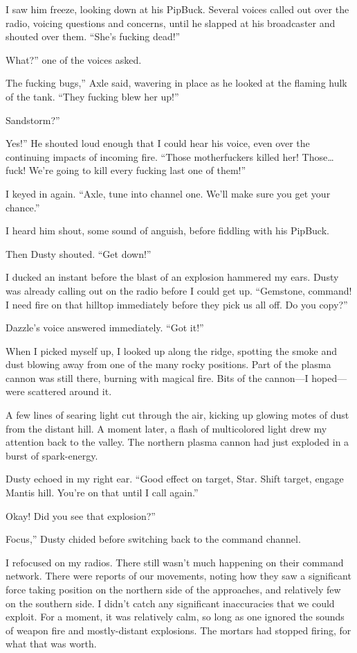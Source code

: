 I saw him freeze, looking down at his PipBuck. Several voices called out over the radio, voicing questions and concerns, until he slapped at his broadcaster and shouted over them. “She’s fucking dead!”

\leavevmode{}What?” one of the voices asked.

\leavevmode{}The fucking bugs,” Axle said, wavering in place as he looked at the flaming hulk of the tank. “They fucking blew her up!”

\leavevmode{}Sandstorm?”

\leavevmode{}Yes!” He shouted loud enough that I could hear his voice, even over the continuing impacts of incoming fire. “Those motherfuckers killed her! Those… fuck! We’re going to kill every fucking last one of them!”

I keyed in again. “Axle, tune into channel one. We’ll make sure you get your chance.”

I heard him shout, some sound of anguish, before fiddling with his PipBuck.

Then Dusty shouted. “Get down!”

I ducked an instant before the blast of an explosion hammered my ears. Dusty was already calling out on the radio before I could get up. “Gemstone, command! I need fire on that hilltop immediately before they pick us all off. Do you copy?”

Dazzle’s voice answered immediately. “Got it!”

When I picked myself up, I looked up along the ridge, spotting the smoke and dust blowing away from one of the many rocky positions. Part of the plasma cannon was still there, burning with magical fire. Bits of the cannon—I hoped—were scattered around it.

A few lines of searing light cut through the air, kicking up glowing motes of dust from the distant hill. A moment later, a flash of multicolored light drew my attention back to the valley. The northern plasma cannon had just exploded in a burst of spark-energy.

Dusty echoed in my right ear. “Good effect on target, Star. Shift target, engage Mantis hill. You’re on that until I call again.”

\leavevmode{}Okay! Did you see that explosion?”

\leavevmode{}Focus,” Dusty chided before switching back to the command channel.

I refocused on my radios. There still wasn’t much happening on their command network. There were reports of our movements, noting how they saw a significant force taking position on the northern side of the approaches, and relatively few on the southern side. I didn’t catch any significant inaccuracies that we could exploit. For a moment, it was relatively calm, so long as one ignored the sounds of weapon fire and mostly-distant explosions. The mortars had stopped firing, for what that was worth.

